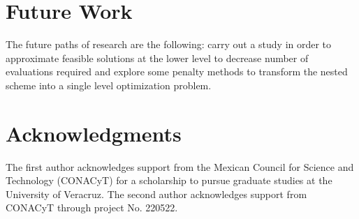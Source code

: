 \documentclass[conference]{IEEEtran}
\begin{document}
\section{Future Work}
\label{sec:future}

The future paths of research are the following: carry out a study in
order to approximate feasible solutions at the lower level to decrease number of
evaluations required and explore some penalty methods to transform the
nested scheme into a single level optimization problem.

\section*{Acknowledgments}
The first author acknowledges support from the Mexican Council for Science and
Technology (CONACyT) for a scholarship to pursue graduate studies at the University
of Veracruz. The second author acknowledges support from CONACyT through project
No. 220522. 











\end{document}
